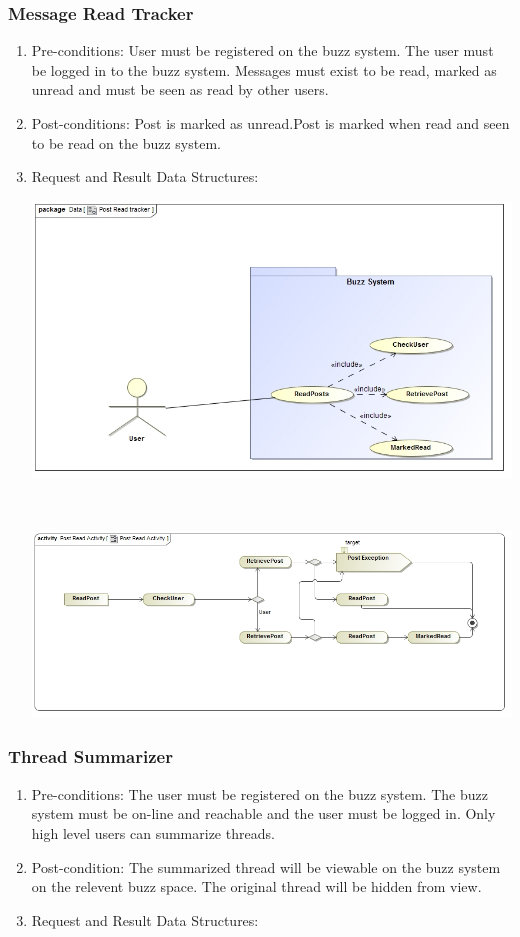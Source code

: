 \documentclass[hidelinks, 12pt, oneside]{article}
\begin{document}
\subsubsection{Message Read Tracker}
\begin{enumerate}
 \item Pre-conditions:  User must be registered on the buzz system. The user must be logged in to the buzz system. Messages must exist to be read, marked as unread and must be seen as read by other users.

 \item Post-conditions: Post is marked as unread.Post is marked when read and seen to be read on the buzz system.

 \item Request and Result Data Structures:\\
   \centerline{\includegraphics[scale=0.4]{PostReadTracker}}\\
 \centerline{\includegraphics[scale=0.4]{PostReadActivity}} 
\end{enumerate}
\subsubsection{Thread Summarizer}
\begin{enumerate}
 \item Pre-conditions:  The user must be registered on the buzz system. The buzz system must be on-line and reachable and the user must be logged in. Only high level users can summarize threads.
 \item Post-condition:  The summarized thread will be viewable on the buzz system on the relevent buzz space. The original thread will be hidden from view.

\item Request and Result Data Structures:\\
\end{enumerate}
\end{document}
